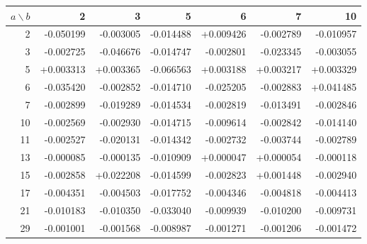 \begin{tabular}{rrrrrrr}
\toprule $a\backslash b$ & 2 & 3 & 5 & 6 & 7 & 10\\\midrule
2 & -0.050199 & -0.003005 & -0.014488 & +0.009426 & -0.002789 & -0.010957\\
3 & -0.002725 & -0.046676 & -0.014747 & -0.002801 & -0.023345 & -0.003055\\
5 & +0.003313 & +0.003365 & -0.066563 & +0.003188 & +0.003217 & +0.003329\\
6 & -0.035420 & -0.002852 & -0.014710 & -0.025205 & -0.002883 & +0.041485\\
7 & -0.002899 & -0.019289 & -0.014534 & -0.002819 & -0.013491 & -0.002846\\
10 & -0.002569 & -0.002930 & -0.014715 & -0.009614 & -0.002842 & -0.014140\\
11 & -0.002527 & -0.020131 & -0.014342 & -0.002732 & -0.003744 & -0.002789\\
13 & -0.000085 & -0.000135 & -0.010909 & +0.000047 & +0.000054 & -0.000118\\
15 & -0.002858 & +0.022208 & -0.014599 & -0.002823 & +0.001448 & -0.002940\\
17 & -0.004351 & -0.004503 & -0.017752 & -0.004346 & -0.004818 & -0.004413\\
21 & -0.010183 & -0.010350 & -0.033040 & -0.009939 & -0.010200 & -0.009731\\
29 & -0.001001 & -0.001568 & -0.008987 & -0.001271 & -0.001206 & -0.001472\\
\bottomrule
\end{tabular}

